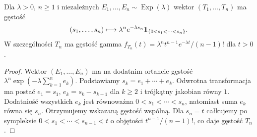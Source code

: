 \begin{lemat}
Dla $\lambda>0$, $n\ge1$ i niezależnych
$E_1,\ldots,E_n\sim\operatorname{Exp}(\lambda)$ wektor
$(T_1,\ldots,T_n)$ ma gęstość
\[
(s_1,\ldots,s_n)\longmapsto
\lambda^n e^{-\lambda s_n}\mathbf{1}_{\{0<s_1<\cdots<s_n\}}.
\]
W szczególności $T_n$ ma gęstość gamma
$f_{T_n}(t)=\lambda^n t^{n-1}e^{-\lambda t}/(n-1)!$ dla $t>0$.
\end{lemat}
\begin{proof}
Wektor $(E_1,\ldots,E_n)$ ma na dodatnim ortancie gęstość
$\lambda^n\exp(-\lambda\sum_{k=1}^n e_k)$.
Podstawiamy $s_k=e_1+\cdots+e_k$. Odwrotna transformacja ma postać
$e_1=s_1$, $e_k=s_k-s_{k-1}$ dla $k\ge2$ i trójkątny jakobian
równy $1$. Dodatniość wszystkich $e_k$ jest równoważna
$0<s_1<\cdots<s_n$, natomiast suma $e_k$ równa się $s_n$.
Otrzymujemy wskazaną gęstość wspólną. Dla $s_n=t$ całkujemy po
sympleksie $0<s_1<\cdots<s_{n-1}<t$ o objętości
$t^{n-1}/(n-1)!$, co daje gęstość $T_n$.
\end{proof}

